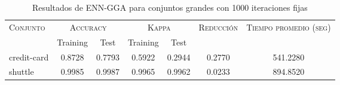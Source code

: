 \begin{table}[]
\centering
\begin{tabular}{l c c c c c c}
\hline
\multirow{2}{*}{\textsc{Conjunto}}
	& \multicolumn{2}{c}{\textsc{Accuracy}}
	& \multicolumn{2}{c}{\textsc{Kappa}}
	& \textsc{Reducción}
	& \textsc{Tiempo promedio (seg)} \\
	& Training & Test
	& Training & Test \\ 
\hline
\hline

credit-card & 0.8728 & 0.7793 & 0.5922 & 0.2944 & 0.2770 & 541.2280 \\
shuttle & 0.9985 & 0.9987 & 0.9965 & 0.9962 & 0.0233 & 894.8520 \\

\hline
\end{tabular}
\caption{Resultados de ENN-GGA para conjuntos grandes con 1000 iteraciones fijas}
\label{res-grande-enn-gga}
\end{table}

